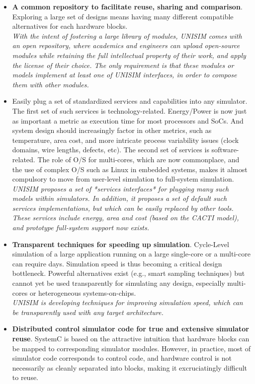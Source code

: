 \begin{itemize}
\item \textbf{A common repository to facilitate reuse, sharing and comparison}. Exploring a large set of designs means having many different compatible alternatives for each hardware blocks.\\
\emph{With the intent of fostering a large library of modules, UNISIM comes with an open repository, where academics and engineers can upload open-source modules while retaining the full intellectual property of their work, and apply the license of their choice. The only requirement is that these modules or models implement at least one of UNISIM interfaces, in order to compose them with other modules.}
\item Easily plug a set of standardized services and capabilities into any simulator. The first set of such services is technology-related. Energy/Power is now just as important a metric as execution time for most processors and SoCs. And system design should increasingly factor in other metrics, such as temperature, area cost, and more intricate process variability issues (clock domains, wire lengths, defects, etc). The second set of services is software-related. The role of O/S for multi-cores, which are now commonplace, and the use of complex O/S such as Linux in embedded systems, makes it almost compulsory to move from user-level simulation to full-system simulation.\\
\emph{UNISIM proposes a set of *services interfaces* for plugging many such models within simulators. In addition, it proposes a set of default such services implementations, but which can be easily replaced by other tools. These services include energy, area and cost (based on the CACTI model), and prototype full-system support now exists.}
\item \textbf{Transparent techniques for speeding up simulation}. Cycle-Level simulation of a large application running on a large single-core or a multi-core can require days. Simulation speed is thus becoming a critical design bottleneck. Powerful alternatives exist (e.g., smart sampling techniques) but cannot yet be used transparently for simulating any design, especially multi-cores or heterogeneous systems-on-chips.\\
\emph{UNISIM is developing techniques for improving simulation speed, which can be transparently used with any target architecture.}
\item \textbf{Distributed control simulator code for true and extensive simulator reuse}. SystemC is based on the attractive intuition that hardware blocks can be mapped to corresponding simulator modules. However, in practice, most of simulator code corresponds to control code, and hardware control is not necessarily as cleanly separated into blocks, making it excruciatingly difficult to reuse.\\

\end{itemize}
